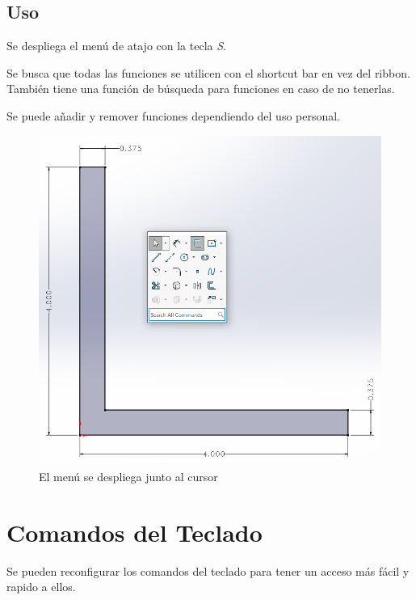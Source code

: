 \documentclass{report}
\begin{document}
\section{Uso}

Se despliega el menú de atajo con la tecla \emph{S}.

Se busca que todas las funciones se utilicen con el shortcut bar en vez del ribbon. También tiene una función de búsqueda para funciones en caso de no tenerlas.

Se puede añadir y remover funciones dependiendo del uso personal.

\begin{figure}[H]
	\centering
	\includegraphics[width=0.85\linewidth, height=0.5\textheight,keepaspectratio]{Imagenes/solidworks_shortcutbars_07}
	\caption{El menú se despliega junto al cursor}
	\label{fig:solidworksshortcutbars07}
\end{figure}



\chapter{Comandos del Teclado}

Se pueden reconfigurar los comandos del teclado para tener un acceso más fácil y rapido a ellos.
\end{document}
